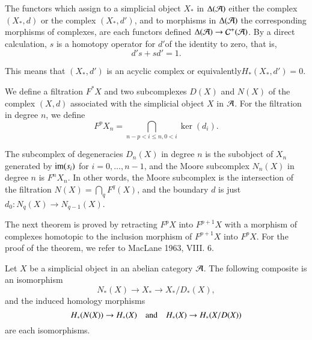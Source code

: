 \begin{remark}\label{chap3-rem2.4}
The functors which assign to a simplicial object $X_{\ast}$ in
$\Delta(\mathcal{A})$ either the complex $(X_{\ast},d)$ or the complex
$(X_{\ast},d')$, and to morphisms in $\Delta(\mathcal{A})$ the corresponding
morphisms of complexes, are each functors defined $\Delta(\mathcal{A})\to
\mathcal{C}^{+}(\mathcal{A})$. By a direct calculation, $s$ is a homotopy operator for
$d'$\pageoriginale of the identity to zero, that is,
$$
d's+sd'=1.
$$

This means that $(X_{\ast},d')$ is an acyclic complex or
equivalently\break $H_{\ast}(X_{\ast},d')=0$. 
\end{remark}

\begin{notation}\label{chap3-not2.5}
We define a filtration $F^{\ast}X$ and two subcomplexes $D(X)$ and
$N(X)$ of the complex $(X,d)$ associated with the simplicial object
$X$ in $\mathcal{A}$. For the filtration in degree $n$, we define
$$
F^{p}X_{n}=\bigcap_{n-p<i\leq n,0<i}\ker(d_{i}).
$$

The subcomplex of degeneracies $D_{n}(X)$ in degree $n$ is the
subobject of $X_{n}$ generated by $\operatorname{im}(s_{i})$ for $i=0,\ldots,n-1$,
and the Moore subcomplex $N_{n}(X)$ in degree $n$ is $F^{n}X_{n}$. In
other words, the Moore subcomplex is the intersection of the
filtration $\displaystyle{N(X)=\bigcap_{q}F^{q}(X)}$, and the boundary $d$ is just
$d_{0}:N_{q}(X)\to N_{q-1}(X)$.
\end{notation}

The next theorem is proved by retracting $F^{p}X$ into $F^{p+1}X$ with
a morphism of complexes homotopic to the inclusion morphism of
$F^{p+1}X$ into $F^{p}X$. For the proof of the theorem, we refer to
MacLane 1963, VIII. 6.

\begin{theorem}\label{chap3-thm2.6}
Let $X$ be a simplicial object in an abelian category $\mathcal{A}$. The
following composite is an isomorphism
$$
N_{\ast}(X)\to X_{\ast}\to X_{\ast}/D_{\ast}(X),
$$
and the induced homology morphisms
$$
H_{\ast}(N(X))\to H_{\ast}(X)\quad\text{and}\quad H_{\ast}(X)\to
H_{\ast}(X/D(X))
$$
are each isomorphisms.
\end{theorem}

